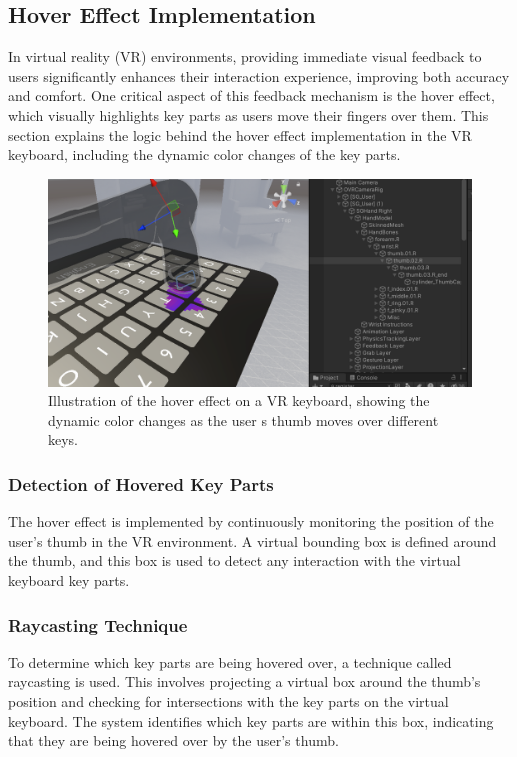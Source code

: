 \subsection{Hover Effect Implementation}

In virtual reality (VR) environments, providing immediate visual feedback to users significantly enhances their interaction experience, improving both accuracy and comfort. One critical aspect of this feedback mechanism is the hover effect, which visually highlights key parts as users move their fingers over them. This section explains the logic behind the hover effect implementation in the VR keyboard, including the dynamic color changes of the key parts.

\begin{figure}[h!]
    \centering
    \includegraphics[width=\linewidth]{Development/Color_ThumbCap.PNG}
    \caption{Illustration of the hover effect on a VR keyboard, showing the dynamic color changes as the user s thumb moves over different keys.}
    \label{fig:keyboard_hover_effect}
\end{figure} \noindent

\subsubsection{Detection of Hovered Key Parts}

The hover effect is implemented by continuously monitoring the position of the user's thumb in the VR environment. A virtual bounding box is defined around the thumb, and this box is used to detect any interaction with the virtual keyboard key parts.

\subsubsection{Raycasting Technique}

To determine which key parts are being hovered over, a technique called raycasting is used. This involves projecting a virtual box around the thumb's position and checking for intersections with the key parts on the virtual keyboard. The system identifies which key parts are within this box, indicating that they are being hovered over by the user's thumb.

